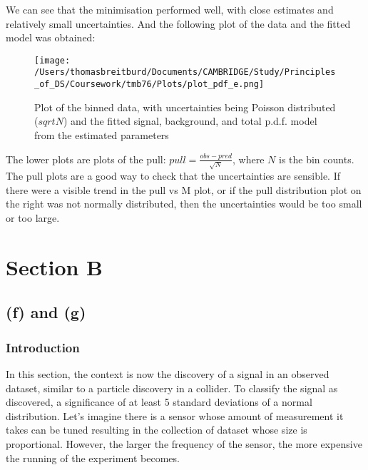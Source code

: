 \documentclass[12pt]{report} %
\begin{document}
We can see that the minimisation performed well, with close estimates and relatively small uncertainties. And the following plot of the data and the fitted model was obtained:

\begin{figure}[tp]
    \centering
    \texttt{[image: /Users/thomasbreitburd/Documents/CAMBRIDGE/Study/Principles\_of\_DS/Coursework/tmb76/Plots/plot\_pdf\_e.png]}
    \captionsetup{margin=1.3cm}
    \caption[width=0.2\pdfpagewidth]{Plot of the binned data, with uncertainties being Poisson distributed ($sqrt{N}$) and the fitted signal, background, and total p.d.f. model from the estimated parameters}
\end{figure}

\newpage

The lower plots are plots of the pull: $pull = \frac{obs - pred}{\sqrt{N}}$, where $N$ is the bin counts. The pull plots are a good way to check that the uncertainties are sensible. If there were a visible trend in the pull vs M plot, or if the pull distribution plot on the right was not normally distributed, then the uncertainties would be too small or too large.


\section{Section B}

\subsection*{(f) and (g)}

\subsubsection*{Introduction}
In this section, the context is now the discovery of a signal in an observed dataset, similar to a particle discovery in a collider. To classify the signal as discovered, a significance of at least 5 standard deviations of a normal distribution. Let's imagine there is a sensor whose amount of measurement it takes can be tuned resulting in the collection of dataset whose size is proportional. However, the larger the frequency of the sensor, the more expensive the running of the experiment becomes.  
\end{document}
